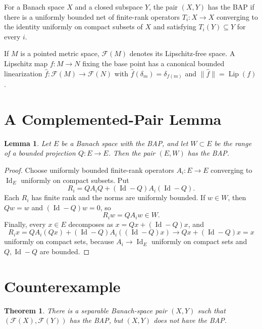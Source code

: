 \documentclass[11pt]{article}
\newtheorem{theorem}{Theorem}
\newtheorem{lemma}{Lemma}
\newcommand{\F}{\mathscr F}
\newcommand{\Lip}{\operatorname{Lip}}
\newcommand{\Id}{\operatorname{Id}}
\begin{document}
For a Banach space \(X\) and a closed subspace \(Y\), the pair \((X,Y)\) has
the BAP if there is a uniformly bounded net of finite-rank operators
\(T_i:X\to X\) converging to the identity uniformly on compact subsets of \(X\)
and satisfying \(T_i(Y)\subseteq Y\) for every \(i\).

If \(M\) is a pointed metric space, \(\F(M)\) denotes its Lipschitz-free space.
A Lipschitz map \(f:M\to N\) fixing the base point has a canonical bounded
linearization \(\widehat f:\F(M)\to\F(N)\) with
\(\widehat f(\delta_m)=\delta_{f(m)}\) and
\(\|\widehat f\|=\Lip(f)\).

\section*{A Complemented-Pair Lemma}

\begin{lemma}
Let \(E\) be a Banach space with the BAP, and let \(W\subset E\) be the range
of a bounded projection \(Q:E\to E\). Then the pair \((E,W)\) has the BAP.
\end{lemma}

\begin{proof}
Choose uniformly bounded finite-rank operators \(A_i:E\to E\) converging to
\(\Id_E\) uniformly on compact subsets. Put
\[
 R_i = Q A_i Q + (\Id-Q)A_i(\Id-Q).
\]
Each \(R_i\) has finite rank and the norms are uniformly bounded. If
\(w\in W\), then \(Qw=w\) and \((\Id-Q)w=0\), so
\[
 R_iw=QA_iw\in W.
\]
Finally, every \(x\in E\) decomposes as \(x=Qx+(\Id-Q)x\), and
\[
 R_ix
 =Q A_i(Qx)+(\Id-Q)A_i((\Id-Q)x)
 \longrightarrow Qx+(\Id-Q)x=x
\]
uniformly on compact sets, because \(A_i\to\Id_E\) uniformly on compact sets
and \(Q,\Id-Q\) are bounded.
\end{proof}

\section*{Counterexample}

\begin{theorem}
There is a separable Banach-space pair \((X,Y)\) such that
\((\F(X),\F(Y))\) has the BAP, but \((X,Y)\) does not have the BAP.
\end{theorem}
\end{document}
